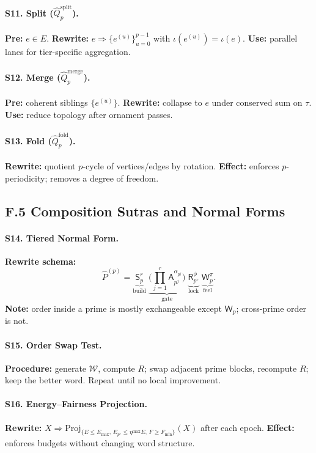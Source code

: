 \documentclass[12pt]{article}
\numberwithin{equation}{section}
\theoremstyle{plain}
\theoremstyle{definition}
\theoremstyle{remark}
\begin{document}
\paragraph{S11. Split ($\hat{Q}_p^{\mathrm{split}}$).}
\textbf{Pre:} $e\in E$. 
\textbf{Rewrite:} $e\Rightarrow \{e^{(u)}\}_{u=0}^{p-1}$ with $\iota(e^{(u)})=\iota(e)$.
\textbf{Use:} parallel lanes for tier-specific aggregation.

\paragraph{S12. Merge ($\hat{Q}_p^{\mathrm{merge}}$).}
\textbf{Pre:} coherent siblings $\{e^{(u)}\}$.
\textbf{Rewrite:} collapse to $e$ under conserved sum on $\tau$.
\textbf{Use:} reduce topology after ornament passes.

\paragraph{S13. Fold ($\hat{Q}_p^{\mathrm{fold}}$).}
\textbf{Rewrite:} quotient $p$-cycle of vertices/edges by rotation.
\textbf{Effect:} enforces $p$-periodicity; removes a degree of freedom.

\subsection*{F.5 Composition Sutras and Normal Forms}
\paragraph{S14. Tiered Normal Form.}
\textbf{Rewrite schema:}
\[
\hat{P}^{(p)}=\underbrace{\mathsf{S}_p^{r}}_{\text{build}}\;\underbrace{\Big(\prod_{j=1}^{r}\mathsf{A}_{p^j}^{\alpha_{p^j}}\Big)}_{\text{gate}}\;\underbrace{\mathsf{R}_{p^r}^{\phi}}_{\text{lock}}\;\underbrace{\mathsf{W}_p^{\pi}}_{\text{feel}}.
\]
\textbf{Note:} order inside a prime is mostly exchangeable except $\mathsf{W}_p$; cross-prime order is not.

\paragraph{S15. Order Swap Test.}
\textbf{Procedure:} generate $\mathcal{W}$, compute $R$; swap adjacent prime blocks, recompute $R$; keep the better word. Repeat until no local improvement.

\paragraph{S16. Energy–Fairness Projection.}
\textbf{Rewrite:} $X\Rightarrow \mathrm{Proj}_{\{E\le E_{\max},\,E_{p^r}\le \eta^{\max}E,\,F\ge F_{\min}\}}(X)$ after each epoch.
\textbf{Effect:} enforces budgets without changing word structure.
\end{document}
